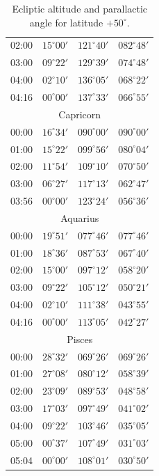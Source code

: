 \begin{table}[!h]
\begin{Parallel}{}{}
{{\begin{tabular}{l|lll}
02:00 & $15^\circ 00'$ & $121^\circ 40'$ & $082^\circ 48'$\\
03:00 & $09^\circ 22'$ & $129^\circ 39'$ & $074^\circ 48'$\\
04:00 & $02^\circ 10'$ & $136^\circ 05'$ & $068^\circ 22'$\\
04:16 & $00^\circ 00'$ & $137^\circ 33'$ & $066^\circ 55'$\\
\multicolumn{4}{c}{Capricorn}\\
00:00 & $16^\circ 34'$ & $090^\circ 00'$ & $090^\circ 00'$\\
01:00 & $15^\circ 22'$ & $099^\circ 56'$ & $080^\circ 04'$\\
02:00 & $11^\circ 54'$ & $109^\circ 10'$ & $070^\circ 50'$\\
03:00 & $06^\circ 27'$ & $117^\circ 13'$ & $062^\circ 47'$\\
03:56 & $00^\circ 00'$ & $123^\circ 24'$ & $056^\circ 36'$\\
\multicolumn{4}{c}{Aquarius}\\
00:00 & $19^\circ 51'$ & $077^\circ 46'$ & $077^\circ 46'$\\
01:00 & $18^\circ 36'$ & $087^\circ 53'$ & $067^\circ 40'$\\
02:00 & $15^\circ 00'$ & $097^\circ 12'$ & $058^\circ 20'$\\
03:00 & $09^\circ 22'$ & $105^\circ 12'$ & $050^\circ 21'$\\
04:00 & $02^\circ 10'$ & $111^\circ 38'$ & $043^\circ 55'$\\
04:16 & $00^\circ 00'$ & $113^\circ 05'$ & $042^\circ 27'$\\
\multicolumn{4}{c}{Pisces}\\
00:00 & $28^\circ 32'$ & $069^\circ 26'$ & $069^\circ 26'$\\
01:00 & $27^\circ 08'$ & $080^\circ 12'$ & $058^\circ 39'$\\
02:00 & $23^\circ 09'$ & $089^\circ 53'$ & $048^\circ 58'$\\
03:00 & $17^\circ 03'$ & $097^\circ 49'$ & $041^\circ 02'$\\
04:00 & $09^\circ 22'$ & $103^\circ 46'$ & $035^\circ 05'$\\
05:00 & $00^\circ 37'$ & $107^\circ 49'$ & $031^\circ 03'$\\
05:04 & $00^\circ 00'$ & $108^\circ 01'$ & $030^\circ 50'$\\
\end{tabular}
}}
\end{Parallel}
\caption{Ecliptic altitude and parallactic angle for latitude $+50^\circ$.}
\end{table}

